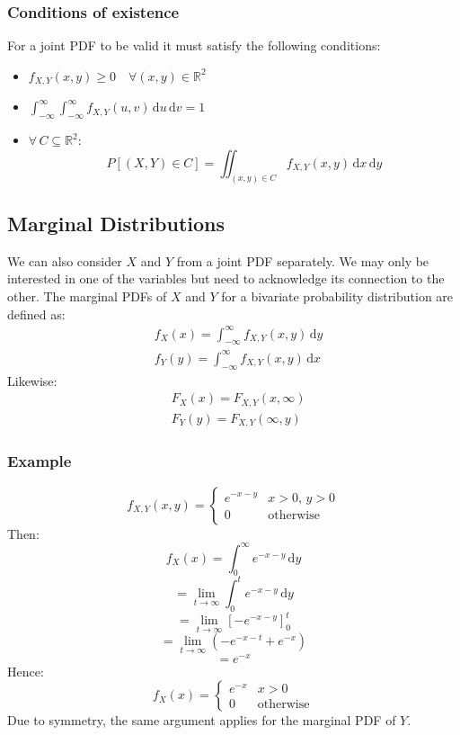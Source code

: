 \documentclass[12pt]{article}
\begin{document}
\subsubsection*{Conditions of existence}
For a joint PDF to be valid it must satisfy the following conditions:
\begin{itemize}
    \item \(f_{X,Y}(x,y)\geq 0\quad \forall(x,y)\in\mathbb{R}^2\)
    \item \(\int^\infty_{-\infty}\int^\infty_{-\infty}f_{X,Y}(u,v)\,\text{d}u\,\text{d}v=1\)
    \item \(\forall\,C\subseteq\mathbb{R}^2:\)
    \[P[(X,Y)\in C]=\iint_{(x,y)\in C}f_{X,Y}(x,y)\,\text{d}x\,\text{d}y\]
\end{itemize}
\subsection{Marginal Distributions}
We can also consider \(X\) and \(Y\) from a joint PDF separately. We may only be interested in one of the variables but need to acknowledge its connection to the other. The marginal PDFs of \(X\) and \(Y\) for a bivariate probability distribution are defined as:
\begin{align*}
    &f_X(x)=\int^\infty_{-\infty}f_{X,Y}(x,y)\,\text{d}y\\
    &f_Y(y)=\int^\infty_{-\infty}f_{X,Y}(x,y)\,\text{d}x
\end{align*}
Likewise:
\begin{align*}
    &F_X(x)=F_{X,Y}(x,\infty)\\
    &F_Y(y)=F_{X,Y}(\infty,y)
\end{align*}
\subsubsection*{Example}
\[f_{X,Y}(x,y)=\begin{cases}
    e^{-x-y} & x>0,\, y>0\\
    0 & \text{otherwise}
\end{cases}\]
Then:
\[f_X(x)=\int^\infty_{0}e^{-x-y}\,\text{d}y\]
\[=\lim_{t\to\infty}\int^t_0e^{-x-y}\,\text{d}y\]
\[=\lim_{t\to\infty}\left[-e^{-x-y}\right]^t_0\]
\[=\lim_{t\to\infty}\left(-e^{-x-t}+e^{-x}\right)\]
\[=e^{-x}\]
Hence:
\[f_X(x)=\begin{cases}
    e^{-x} & x>0\\
    0& \text{otherwise}
\end{cases}\]
Due to symmetry, the same argument applies for the marginal PDF of \(Y\).
\end{document}
